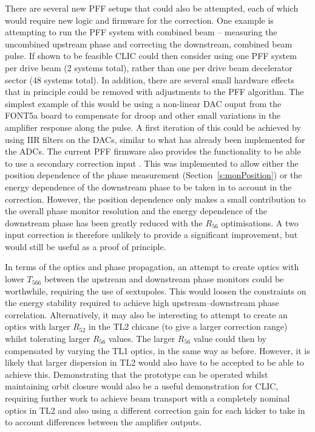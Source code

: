 There are several new PFF setups that could also be attempted, each of which would require new logic and firmware for the correction. One example is attempting to run the PFF system with combined beam -- measuring the uncombined upstream phase and correcting the downstream, combined beam pulse. If shown to be feasible CLIC could then consider using one PFF system per drive beam (2 systems total), rather than one per drive beam decelerator sector (48 systems total). In addition, there are several small hardware effects that in principle could be removed with adjustments to the PFF algorithm. The simplest example of this would be using a non-linear DAC ouput from the FONT5a board to compensate for droop and other small variations in the amplifier response along the pulse. A first iteration of this could be achieved by using IIR filters on the DACs, similar to what has already been implemented for the ADCs. The current PFF firmware also provides the functionality to be able to use a secondary correction input \cite{glennPriv}. This was implemented to allow either the position dependence of the phase measurement (Section~\ref{s:monPosition}) or the energy dependence of the downstream phase to be taken in to account in the correction. However, the position dependence only makes a small contribution to the overall phase monitor resolution and the energy dependence of the downstream phase has been greatly reduced with the \(R_{56}\) optimisations. A two input correction is therefore unlikely to provide a significant improvement, but would still be useful as a proof of principle.

In terms of the optics and phase propagation, an attempt to create optics with lower \(T_{566}\) between the upstream and downstream phase monitors could be worthwhile, requiring the use of sextupoles. This would loosen the constraints on the energy stability required to achieve high upstream--downstream phase correlation. Alternatively, it may also be interesting to attempt to create an optics with larger \(R_{52}\) in the TL2 chicane (to give a larger correction range) whilst tolerating larger \(R_{56}\) values. The larger \(R_{56}\) value could then by compensated by varying the TL1 optics, in the same way as before. However, it is likely that larger dispersion in TL2 would also have to be accepted to be able to achieve this. Demonstrating that the prototype can be operated whilst maintaining orbit closure would also be a useful demonstration for CLIC, requiring further work to achieve beam transport with a completely nominal optics in TL2 and also using a different correction gain for each kicker to take in to account differences between the amplifier outputs.








